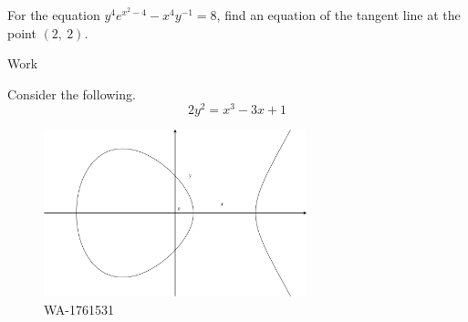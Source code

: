 \documentclass[12pt,addpoints, answers, fleqn]{exam}
\begin{document}
\begin{teacher}
\begin{questions}
\question 	%

For the equation $y^4e^{x^2 - 4} - x^4y^{-1} = 8$, find an equation of the tangent line at the point $\left(2,\ 2 \right)$.

\begin{solution}
Work
\end{solution}

\question 	%

Consider the following.
\[
2y^2 = x^3 - 3x + 1
\]
\begin{figure}[htbp] %
   \centering
   \includegraphics[width=3in]{./graphics/1761531.pdf} 
   \caption{WA-1761531}
   \label{fig:1761531}
\end{figure}

\question 	%


\end{questions}
\end{teacher}
\end{document}
